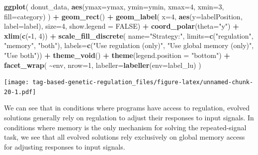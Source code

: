 \documentclass[
]{book}
\newenvironment{Shaded}{\begin{snugshade}}{\end{snugshade}}
\newcommand{\DataTypeTok}[1]{\textcolor[rgb]{0.13,0.29,0.53}{#1}}
\newcommand{\DecValTok}[1]{\textcolor[rgb]{0.00,0.00,0.81}{#1}}
\newcommand{\KeywordTok}[1]{\textcolor[rgb]{0.13,0.29,0.53}{\textbf{#1}}}
\newcommand{\NormalTok}[1]{#1}
\newcommand{\OperatorTok}[1]{\textcolor[rgb]{0.81,0.36,0.00}{\textbf{#1}}}
\newcommand{\OtherTok}[1]{\textcolor[rgb]{0.56,0.35,0.01}{#1}}
\newcommand{\StringTok}[1]{\textcolor[rgb]{0.31,0.60,0.02}{#1}}
\begin{document}
\begin{Shaded}
\begin{Highlighting}[]
\KeywordTok{ggplot}\NormalTok{( donut\_data, }\KeywordTok{aes}\NormalTok{(}\DataTypeTok{ymax=}\NormalTok{ymax, }\DataTypeTok{ymin=}\NormalTok{ymin, }\DataTypeTok{xmax=}\DecValTok{4}\NormalTok{, }\DataTypeTok{xmin=}\DecValTok{3}\NormalTok{, }\DataTypeTok{fill=}\NormalTok{category) ) }\OperatorTok{+}
\StringTok{  }\KeywordTok{geom\_rect}\NormalTok{() }\OperatorTok{+}
\StringTok{  }\KeywordTok{geom\_label}\NormalTok{( }\DataTypeTok{x=}\DecValTok{4}\NormalTok{, }\KeywordTok{aes}\NormalTok{(}\DataTypeTok{y=}\NormalTok{labelPosition, }\DataTypeTok{label=}\NormalTok{label), }\DataTypeTok{size=}\DecValTok{4}\NormalTok{, }\DataTypeTok{show.legend =} \OtherTok{FALSE}\NormalTok{) }\OperatorTok{+}
\StringTok{  }\KeywordTok{coord\_polar}\NormalTok{(}\DataTypeTok{theta=}\StringTok{"y"}\NormalTok{) }\OperatorTok{+}
\StringTok{  }\KeywordTok{xlim}\NormalTok{(}\KeywordTok{c}\NormalTok{(}\OperatorTok{{-}}\DecValTok{1}\NormalTok{, }\DecValTok{4}\NormalTok{)) }\OperatorTok{+}
\StringTok{  }\KeywordTok{scale\_fill\_discrete}\NormalTok{(}
    \DataTypeTok{name=}\StringTok{"Strategy:"}\NormalTok{,}
    \DataTypeTok{limits=}\KeywordTok{c}\NormalTok{(}\StringTok{"regulation"}\NormalTok{,}
             \StringTok{"memory"}\NormalTok{,}
             \StringTok{"both"}\NormalTok{),}
    \DataTypeTok{labels=}\KeywordTok{c}\NormalTok{(}\StringTok{"Use regulation (only)"}\NormalTok{,}
             \StringTok{"Use global memory (only)"}\NormalTok{,}
             \StringTok{"Use both"}\NormalTok{)) }\OperatorTok{+}
\StringTok{  }\KeywordTok{theme\_void}\NormalTok{() }\OperatorTok{+}
\StringTok{  }\KeywordTok{theme}\NormalTok{(}\DataTypeTok{legend.position =} \StringTok{"bottom"}\NormalTok{) }\OperatorTok{+}
\StringTok{  }\KeywordTok{facet\_wrap}\NormalTok{(}
    \OperatorTok{\textasciitilde{}}\NormalTok{env,}
    \DataTypeTok{nrow=}\DecValTok{1}\NormalTok{,}
    \DataTypeTok{labeller=}\KeywordTok{labeller}\NormalTok{(}\DataTypeTok{env=}\NormalTok{label\_lu)}
\NormalTok{  )}
\end{Highlighting}
\end{Shaded}

\texttt{[image: tag-based-genetic-regulation\_files/figure-latex/unnamed-chunk-20-1.pdf]}

We can see that in conditions where programs have access to regulation, evolved solutions generally rely on regulation to adjust their responses to input signals.
In conditions where memory is the only mechanism for solving the repeated-signal task, we see that all evolved solutions rely exclusively on global memory access for adjusting responses to input signals.
\end{document}
